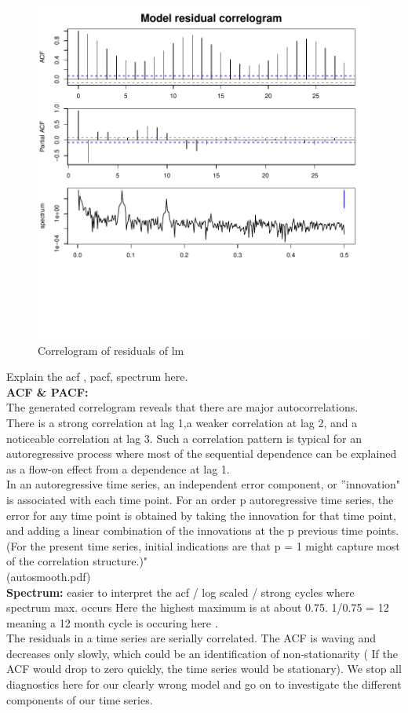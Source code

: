 \documentclass[11pt, a4paper]{article} %
\begin{document}
\begin{figure}[H]
\centering
\includegraphics{alleselena-correlogramres}
\caption{Correlogram of residuals of lm}
\label{correlogramlm}
\end{figure}


Explain the acf , pacf, spectrum here. \\
\textbf{ACF \& PACF:}\\
\noindent The generated correlogram reveals that there are major autocorrelations. \\
There is a strong correlation at lag 1,a weaker correlation at lag 2, and a noticeable correlation at lag 3. Such a correlation pattern is typical for an autoregressive process where most of the sequential dependence can be explained as a flow-on effect from a dependence at lag 1.\\
\noindent In an autoregressive time series, an independent error component, or ''innovation" is associated with each time point. For an order p autoregressive time series, the error for any time point is obtained by taking the innovation for that time point, and adding a linear combination of the innovations at the p previous time points. (For the present time series, initial indications are that p = 1 might capture most of the correlation structure.)"\\ (autosmooth.pdf)\\
\noindent \textbf{Spectrum:} easier to interpret the acf / log scaled / strong cycles where spectrum max. occurs
Here the highest maximum is at about 0.75. 1/0.75 = 12 meaning a 12 month cycle is occuring here .\\
\noindent The residuals in a time series are serially correlated. The ACF is waving and decreases only slowly, which could be an identification of non-stationarity ( If the ACF would drop to zero quickly, the time series would be stationary). We stop all diagnostics here for our clearly wrong model and go on to investigate the different components of our time series.\\
\end{document}
